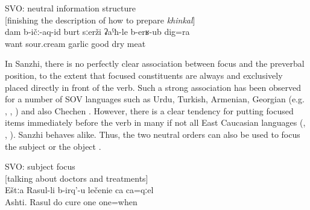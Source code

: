 \begin{exe}
	\ex	SVO: neutral information structure\\	\label{ex:‎‎‎I like garlic, fried tomato sauce, and also well dried-meat SVO}
		[finishing the description of how to prepare \textit{khinkal}]\\
	\gll	dam	b-ičː-aq-id	burt	sːerži	ʡaˁħ-le	b-erʁ-ub	dig=ra\\
		 want sour.cream	garlic	good dry	meat\\
	\glt	{}
\end{exe}

In Sanzhi, there is no perfectly clear association between focus and the preverbal position, to the extent that focused constituents are always and exclusively placed directly in front of the verb. Such a strong association has been observed for a number of SOV languages such as Urdu, Turkish, Armenian, Georgian (e.g. \citealt{ButtKing1996}, \citealt{Comrie1984},  \citealt{Testelec1998b}) and also Chechen \citep{Komen2007}. However, there is a clear tendency for putting focused items immediately before the verb in many if not all East Caucasian languages (\citealt{Testelec1998a}, \citeyearpar{Testelets.1998c}, \citealt{Forker.Belyaev2016}). Sanzhi behaves alike. Thus, the two neutral orders can also be used to focus the subject  or the object .
%
\begin{exe}
	\ex	SVO: subject focus\\\label{ex:‎‎In Ashti Rasul makes cures SVO}%
		[talking about doctors and treatments]\\
	\gll	Eštːa	Rasul-li	b-irq'-u	lečenie	ca	ca=qːel\\
		Ashti.	Rasul	do	cure	one	one=when\\
	\glt	{}
\end{exe}

